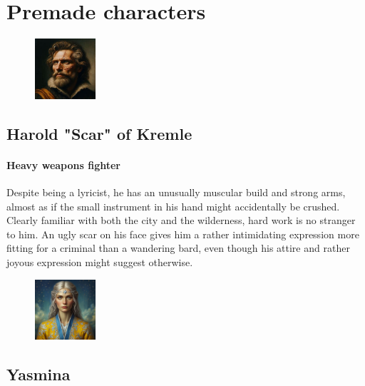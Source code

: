 \documentclass[10pt,onecolumn,twoside,openany,bg=full,layout=true]{dndbook}
\begin{document}
\vfill

\section{Premade characters}\label{sec:premade-characters}
  \begin{figure}
    \begin{center}
      \includegraphics[width=0.2\textwidth]{img/harold}
    \end{center}
  \end{figure}
  \subsection {Harold "Scar" of Kremle}\label{subsec:harold-"scar"-of-kremle}
\paragraph{Heavy weapons fighter}
Despite being a lyricist, he has an unusually muscular build and strong arms, almost as if the small instrument in his
hand might accidentally be crushed.
Clearly familiar with both the city and the wilderness, hard work is no stranger to him.
An ugly scar on his face gives him a rather intimidating expression more fitting for a criminal than a wandering bard,
even though his attire and rather joyous expression might suggest otherwise.

  \begin{figure}
    \begin{center}
      \includegraphics[width=0.2\textwidth]{img/yasmina}
    \end{center}
  \end{figure}
  \subsection{Yasmina}\label{subsec:yasmina}
\end{document}
